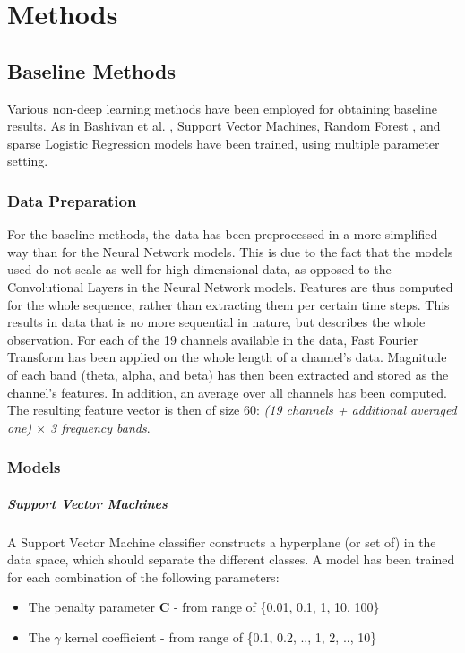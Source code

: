 \documentclass{article}
\begin{document}
\section{Methods}
\subsection{Baseline Methods}
Various non-deep learning methods have been employed for obtaining baseline results.
As in Bashivan et al. \cite[pp. 7-8]{learning_eeg_repr}, Support Vector Machines, Random Forest \cite{random_forests}, and sparse Logistic Regression models have been trained, using multiple parameter setting.
\subsubsection{Data Preparation}
For the baseline methods, the data has been preprocessed in a more simplified way than for the Neural Network models. This is due to the fact that the models used do not scale as well for high dimensional data, as opposed to the Convolutional Layers in the Neural Network models. Features are thus computed for the whole sequence, rather than extracting them per certain time steps. This results in data that is no more sequential in nature, but describes the whole observation.
For each of the 19 channels available in the data, Fast Fourier Transform has been applied on the whole length of a channel's data. Magnitude of each band (theta, alpha, and beta) has then been extracted and stored as the channel's features. In addition, an average over all channels has been computed. The resulting feature vector is then of size 60: \textit{(19 channels + additional averaged one) $\times$ 3 frequency bands}.
\subsubsection{Models}

\subparagraph{Support Vector Machines}
A Support Vector Machine classifier constructs a hyperplane (or set of) in the data space, which should separate the different classes. A model has been trained for each combination of the following parameters:
\begin{itemize}
	\item The penalty parameter \textbf{C} - from range of \{0.01, 0.1, 1, 10, 100\}
	\item The $\gamma$ kernel coefficient - from range of \{0.1, 0.2, .., 1, 2, .., 10\}
\end{itemize}
\end{document}
